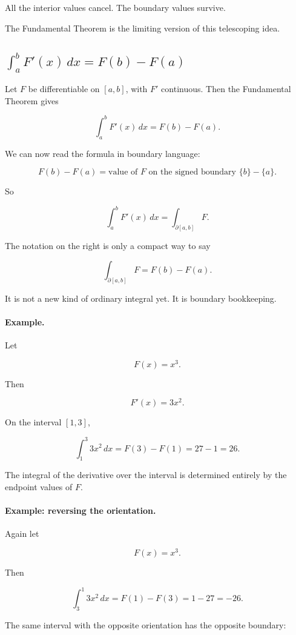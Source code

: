 All the interior values cancel.  The boundary values survive.

The Fundamental Theorem is the limiting version of this telescoping idea.

\subsection{\texorpdfstring{\(\int_a^b F'(x)\,dx=F(b)-F(a)\)}{int a to b F prime equals F(b)-F(a)}}
\label{subsec:ftc-endpoint-formula}

Let \(F\) be differentiable on \([a,b]\), with \(F'\) continuous.  Then the Fundamental
Theorem gives

\[
\boxed{
\int_a^b F'(x)\,dx=F(b)-F(a).
}
\]

We can now read the formula in boundary language:

\[
F(b)-F(a)
=
\text{value of \(F\) on the signed boundary } \{b\}-\{a\}.
\]

So

\[
\boxed{
\int_a^b F'(x)\,dx
=
\int_{\partial[a,b]} F.
}
\]

The notation on the right is only a compact way to say

\[
\int_{\partial[a,b]} F
=
F(b)-F(a).
\]

It is not a new kind of ordinary integral yet.  It is boundary bookkeeping.

\paragraph{Example.}
Let

\[
F(x)=x^3.
\]

Then

\[
F'(x)=3x^2.
\]

On the interval \([1,3]\),

\[
\int_1^3 3x^2\,dx
=
F(3)-F(1)
=
27-1
=
\boxed{26}.
\]

The integral of the derivative over the interval is determined entirely by the endpoint
values of \(F\).

\paragraph{Example: reversing the orientation.}
Again let

\[
F(x)=x^3.
\]

Then

\[
\int_3^1 3x^2\,dx
=
F(1)-F(3)
=
1-27
=
\boxed{-26}.
\]

The same interval with the opposite orientation has the opposite boundary:

